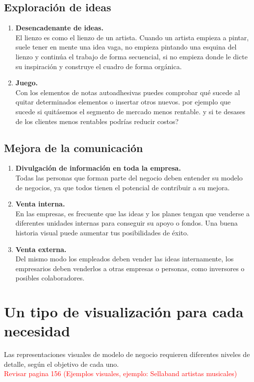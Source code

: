 \documentclass[11pt]{book}
\begin{document}
\subsection{Exploración de ideas}
\begin{enumerate}
\item \textbf{Desencadenante de ideas.}\\
El lienzo es como el lienzo de un artista. Cuando un artista empieza a pintar, suele tener en mente una idea vaga, no empieza pintando una esquina del lienzo y continúa el trabajo de forma secuencial, si no empieza donde le dicte su inspiración y construye el cuadro de forma orgánica.
\item \textbf{Juego.}\\
Con los elementos de notas autoadhesivas puedes comprobar qué sucede al quitar determinados elementos o insertar otros nuevos. por ejemplo que sucede si quitásemos el segmento de mercado menos rentable. y si te desases de los clientes menos rentables podrías reducir costos?
\end{enumerate}
\subsection{Mejora de la comunicación}
\begin{enumerate}
\item \textbf{Divulgación de información en toda la empresa.}\\
Todas las personas que forman parte del negocio deben entender su modelo de negocios, ya que todos tienen el potencial de contribuir a su mejora.
\item \textbf{Venta interna.}\\
En las empresas, es frecuente que las ideas y los planes tengan que venderse a diferentes unidades internas para conseguir su apoyo o fondos. Una buena historia visual puede aumentar tus posibilidades de éxito.
\item \textbf{Venta externa.}\\
Del mismo modo los empleados deben vender las ideas internamente, los empresarios deben venderlos a otras empresas o personas, como inversores o posibles colaboradores. 
\end{enumerate}
\section{Un tipo de visualización para cada necesidad}
Las representaciones visuales de modelo de negocio requieren diferentes niveles de detalle, según el objetivo de cada uno.\\
\textcolor{red}{Revisar pagina 156 (Ejemplos visuales, ejemplo: Sellaband artistas musicales)}
\end{document}
